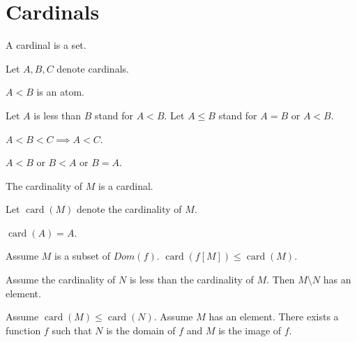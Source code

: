 \documentclass{article}
\newcommand{\card}[1]{\operatorname{card}(#1)}
\begin{document}
  \section{Cardinals}

\begin{forthel}
    \begin{signature}
      A cardinal is a set.
    \end{signature}

    Let $A,B,C$ denote cardinals.
    \begin{signature}
      $A < B$ is an atom.
    \end{signature}

    Let $A$ is less than $B$ stand for $A < B$.
    Let $A \leq B$ stand for $A = B$ or $A < B$.

    \begin{axiom}
      $A < B < C ⟹ A < C$.
    \end{axiom}

    \begin{axiom}
      $A < B$ or $B < A$ or $B = A$.
    \end{axiom}

    \begin{signature}
      The cardinality of $M$ is a cardinal.
    \end{signature}

    Let $\card{M}$ denote the cardinality of $M$.

    \begin{axiom}
      $\card{A} = A$.
    \end{axiom}

    \begin{axiom}[ImageCard]
      Assume $M$ is a subset of $Dom(f)$. $\card{f[M]} \leq \card{M}$.
    \end{axiom}

    \begin{axiom}
      Assume the cardinality of $N$ is less than the cardinality of $M$.
      Then $M \setminus N$ has an element.
    \end{axiom}

    \begin{axiom}[SurjExi]
      Assume $\card{M} \leq \card{N}$. Assume $M$ has an element. There exists a
      function $f$ such that $N$ is the domain of $f$ and $M$ is the image of $f$.
    \end{axiom}

\end{forthel}
\end{document}
